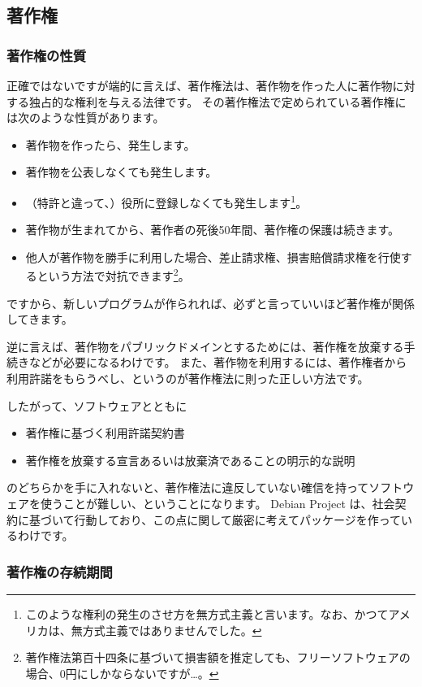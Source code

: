 \documentclass[mingoth,a4paper]{jsarticle}
\begin{document}
\subsection{著作権}
\subsubsection{著作権の性質}

正確ではないですが端的に言えば、著作権法は、著作物を作った人に著作物に対する独占的な権利を与える法律です。
その著作権法で定められている著作権には次のような性質があります。

\begin{itemize}
\item 著作物を作ったら、発生します。
\item 著作物を公表しなくても発生します。
\item （特許と違って、）役所に登録しなくても発生します\footnote{このような権利の発生のさせ方を無方式主義と言います。なお、かつてアメリカは、無方式主義ではありませんでした。}。
\item 著作物が生まれてから、著作者の死後50年間、著作権の保護は続きます。
\item 他人が著作物を勝手に利用した場合、差止請求権、損害賠償請求権を行使するという方法で対抗できます\footnote{著作権法第百十四条に基づいて損害額を推定しても、フリーソフトウェアの場合、0円にしかならないですが…。}。
\end{itemize}
ですから、新しいプログラムが作られれば、必ずと言っていいほど著作権が関係してきます。

逆に言えば、著作物をパブリックドメインとするためには、著作権を放棄する手続きなどが必要になるわけです。
また、著作物を利用するには、著作権者から利用許諾をもらうべし、というのが著作権法に則った正しい方法です。

したがって、ソフトウェアとともに
\begin{itemize}
\item 著作権に基づく利用許諾契約書
\item 著作権を放棄する宣言あるいは放棄済であることの明示的な説明
\end{itemize}
のどちらかを手に入れないと、著作権法に違反していない確信を持ってソフトウェアを使うことが難しい、ということになります。
Debian Project は、社会契約\cite{DebianSocialContract}に基づいて行動しており、この点に関して厳密に考えてパッケージを作っているわけです。

\subsubsection{著作権の存続期間}
\end{document}

